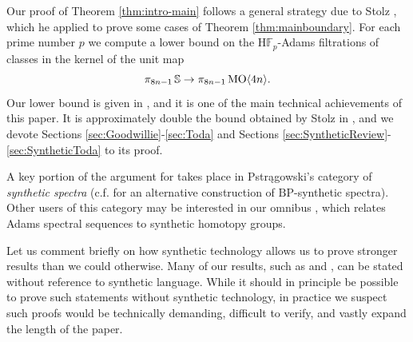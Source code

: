 Our proof of Theorem \ref{thm:intro-main} follows a general strategy due to Stolz \cite{StolzBook}, which he applied to prove some cases of Theorem \ref{thm:mainboundary}.  For each prime number $p$ we compute a lower bound on the $\mathrm{H}\mathbb{F}_p$-Adams filtrations of classes in the kernel of the unit map
$$\pi_{8n-1} \operatorname{\mathbb{S}} \to \pi_{8n-1} \operatorname{\mathrm{MO}} \langle 4n \rangle.$$
Our lower bound is given in , and it is one of the main technical achievements of this paper.  It is approximately double the bound obtained by Stolz in \cite[Satz 12.7]{StolzBook}, and we devote Sections \ref{sec:Goodwillie}-\ref{sec:Toda} and Sections \ref{sec:SyntheticReview}-\ref{sec:SyntheticToda} to its proof.

\begin{rmk}
A key portion of the argument for  takes place in Pstr\k{a}gowski's category of \emph{synthetic spectra} \cite{Pstragowski} (c.f. \cite{GIKR} for an alternative construction of $\mathrm{BP}$-synthetic spectra).  Other users of this category may be interested in our omnibus , which relates Adams spectral sequences to synthetic homotopy groups.

Let us comment briefly on how synthetic technology allows us to prove stronger results than we could otherwise.  Many of our results, such as  and , can be stated without reference to synthetic language.  While it should in principle be possible to prove such statements without synthetic technology, in practice we suspect such proofs would be technically demanding, difficult to verify, and vastly expand the length of the paper.



\end{rmk}
